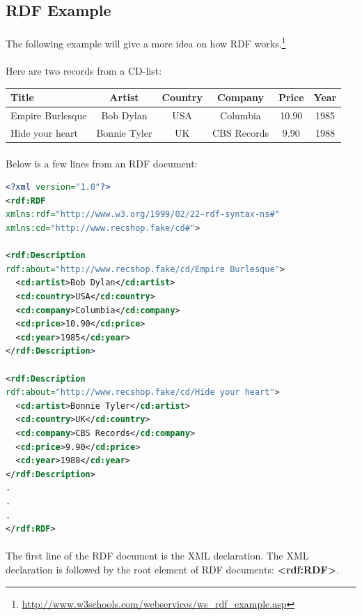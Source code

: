\documentclass[a4paper,11pt]{report}
\begin{document}
\subsection{RDF Example}
\paragraph{}
The following example will give a more idea on how RDF works.\footnote{\url{
http://www.w3schools.com/webservices/ws_rdf_example.asp}}
 
 \paragraph{}
Here are two records from a CD-list:
 
\begin{center} 
\begin{tabular}{ | l | c | c | c | c | c |}
 \hline
 Title & Artist & Country & Company & Price & Year \\ \hline
 Empire Burlesque & Bob Dylan & USA &	Columbia & 10.90 &	1985 \\
 \hline
  Hide your heart & Bonnie Tyler & UK &	CBS Records &9.90 &	1988 \\
 \hline
\end{tabular}
\end{center}

\paragraph{}
Below is a few lines from an RDF document:

\begin{lstlisting}[language=XML]
<?xml version="1.0"?>
<rdf:RDF
xmlns:rdf="http://www.w3.org/1999/02/22-rdf-syntax-ns#"
xmlns:cd="http://www.recshop.fake/cd#">

<rdf:Description
rdf:about="http://www.recshop.fake/cd/Empire Burlesque">
  <cd:artist>Bob Dylan</cd:artist>
  <cd:country>USA</cd:country>
  <cd:company>Columbia</cd:company>
  <cd:price>10.90</cd:price>
  <cd:year>1985</cd:year>
</rdf:Description>

<rdf:Description
rdf:about="http://www.recshop.fake/cd/Hide your heart">
  <cd:artist>Bonnie Tyler</cd:artist>
  <cd:country>UK</cd:country>
  <cd:company>CBS Records</cd:company>
  <cd:price>9.90</cd:price>
  <cd:year>1988</cd:year>
</rdf:Description>
.
.
.
</rdf:RDF> 


\end{lstlisting}
\paragraph{}
The first line of the RDF document is the XML declaration. The XML declaration is followed by the root element of RDF documents: \textbf{\textless rdf:RDF\textgreater}.
\end{document}
